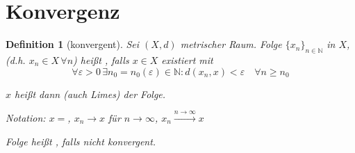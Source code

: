 \documentclass[ngerman,a4paper]{report}
\theoremstyle{break}
\newtheorem*{definition}{Definition}
\renewcommand{\epsilon}{\varepsilon}
\begin{document}
\section{Konvergenz}\setcounter{theorem}{0}
\begin{definition}[konvergent]
	Sei $(X,d)$ metrischer Raum. Folge $\{x_n\}_{n\in\mathbb{N}}$ in $X$, (d.h. $x_n\in X\,\forall n$) heißt , falls $x\in X$ existiert mit \[\forall \epsilon > 0 \,\exists n_0=n_0(\epsilon)\in\mathbb{N}: d(x_n, x) < \epsilon\quad \forall n\ge n_0\]
	
	$x$ heißt dann  (auch Limes) der Folge.
	
	Notation: $x=$, $x_n\rightarrow x$ für $n\rightarrow\infty$, $x_n \overset{n\rightarrow\infty}{\longrightarrow}x$
	
	Folge heißt , falls nicht konvergent.
\end{definition}
\end{document}
